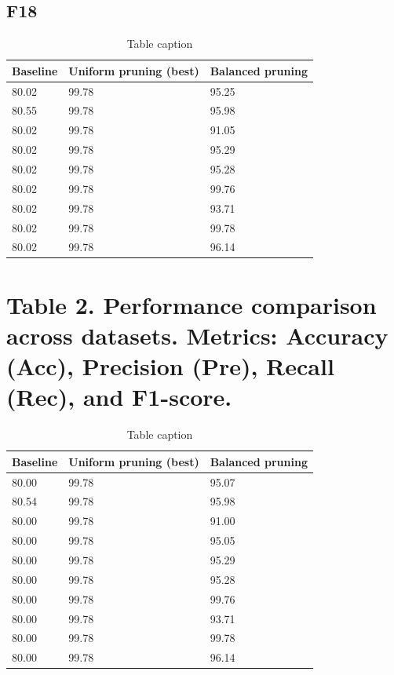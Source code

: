 \documentclass[final,5p,times,twocolumn,authoryear]{elsarticle}
\begin{document}
\subsection{F18}
\begin{table}[htbp]
\centering
\caption{Table caption}
\begin{tabular}{lll}
\hline
Baseline & Uniform pruning (best) & Balanced pruning \\
\hline
80.02 & 99.78 & 95.25 \\
80.55 & 99.78 & 95.98 \\
80.02 & 99.78 & 91.05 \\
80.02 & 99.78 & 95.29 \\
80.02 & 99.78 & 95.28 \\
80.02 & 99.78 & 99.76 \\
80.02 & 99.78 & 93.71 \\
80.02 & 99.78 & 99.78 \\
80.02 & 99.78 & 96.14 \\
\hline
\end{tabular}
\end{table}
\section{Table 2. Performance comparison across datasets. Metrics: Accuracy (Acc), Precision (Pre), Recall (Rec), and F1-score.}
\begin{table}[htbp]
\centering
\caption{Table caption}
\begin{tabular}{lll}
\hline
Baseline & Uniform pruning (best) & Balanced pruning \\
\hline
80.00 & 99.78 & 95.07 \\
80.54 & 99.78 & 95.98 \\
80.00 & 99.78 & 91.00 \\
80.00 & 99.78 & 95.05 \\
80.00 & 99.78 & 95.29 \\
80.00 & 99.78 & 95.28 \\
80.00 & 99.78 & 99.76 \\
80.00 & 99.78 & 93.71 \\
80.00 & 99.78 & 99.78 \\
80.00 & 99.78 & 96.14 \\
\hline
\end{tabular}
\end{table}
\end{document}
